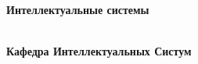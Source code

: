 \thispagestyle{empty}

\vspace{3cm}
  \begin{center}
	\bfseries \Huge Интеллектуальные системы  \par   %
        ~\\
	\bfseries \LARGE Кафедра Интеллектуальных Систум \\   %
    \end{center}